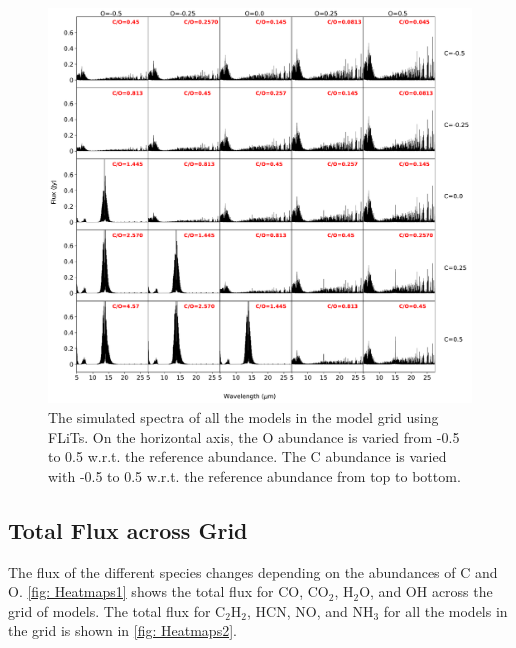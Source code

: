 \documentclass[twoside, single, authoryear, semicolon, 12pt]{lion-msc}
\newcommand{\4}{$_4$}
\newcommand{\3}{$_3$}
\newcommand{\2}{$_2$}
\begin{document}
\begin{figure}[!ht]
    \centering
    \includegraphics[width=\linewidth]{Figures/All_spectra.pdf}
    \caption{The simulated spectra of all the models in the model grid using FLiTs. On the horizontal axis, the O abundance is varied from -0.5 to 0.5 w.r.t. the reference abundance. The C abundance is varied with -0.5 to 0.5 w.r.t. the reference abundance from top to bottom.}
    \label{fig: all spectra}
\end{figure}
\subsection{Total Flux across Grid}
The flux of the different species changes depending on the abundances of C and O. \autoref{fig: Heatmaps1} shows the total flux for CO, CO\2, H\2O, and OH across the grid of models. The total flux for C\2H\2, HCN, NO, and NH\3 for all the models in the grid is shown in \autoref{fig: Heatmaps2}. 
\end{document}
